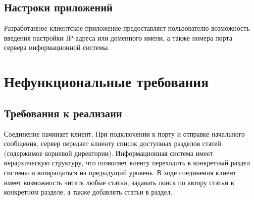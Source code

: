 \documentclass[12pt,a4paper]{report}
\begin{document}
\subsection{Настроки приложений}
Разработанное клиентское приложение предоставляет пользователю возможность введения настройки IP-адреса или доменного имени, а также номера порта сервера информационной системы.
\section{Нефункциональные требования}
\subsection{Требования к реализаии}
Соединение начинает клиент. При подключении к порту и отправке начального сообщения, сервер передает клиенту список доступных разделов статей (содержимое корневой директории). Информационная система имеет иерархическую структуру, что позволяет киенту переходить в конкретный раздел системы и возвращаться на предыдущий уровень. В ходе соединения клиент имеет возможность читать любые статьи, задавать поиск по автору статьи в конкретном разделе, а также добавлять статьи в раздел. 
\end{document}
